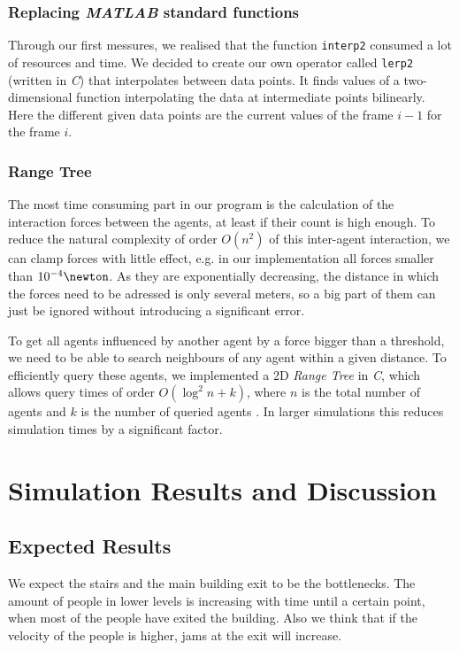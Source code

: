 \documentclass[11pt]{article}
\begin{document}
\subsubsection{Replacing \textit{MATLAB} standard functions}

Through our first messures, we realised that the function \verb+interp2+
consumed a lot of resources and time. We decided to create our own operator
called \verb+lerp2+ (written in \textit{C}) that interpolates between data points. It finds values of a
two-dimensional function interpolating the data at intermediate points bilinearly.
Here the different given data points are the current values of the frame $i-1$
for the frame $i$. 

\subsubsection{Range Tree}
The most time consuming part in our program is the calculation of the interaction
forces between the agents, at least if their count is high enough. To reduce the
natural complexity of order $O(n^{2})$ of this inter-agent interaction, we can clamp forces
with little effect, e.g. in our implementation all forces smaller than $ 10^{-4}\newton$.
As they are exponentially decreasing, the distance in which the forces need to be adressed
is only several meters, so a big part of them can just be ignored without introducing 
a significant error.

To get all agents influenced by another agent by a force bigger than a threshold, we need to be able
to search neighbours of any agent within a given distance. To efficiently query 
these agents, we implemented a 2D \textit{Range Tree} in \textit{C}, which allows query times
of order $O(\log^{2} n+k)$, where $n$ is the total number of agents and $k$ is the number of
queried agents \cite{algdat}. In larger simulations this reduces simulation times by a significant factor.

\section{Simulation Results and Discussion}

\subsection{Expected Results}

We expect the stairs and the main building exit to be the bottlenecks. The
amount of people in lower levels is increasing with time until a certain point,
when most of the people have exited the building. Also we think that if the 
velocity of the people is higher, jams at the exit will increase.
\end{document}
